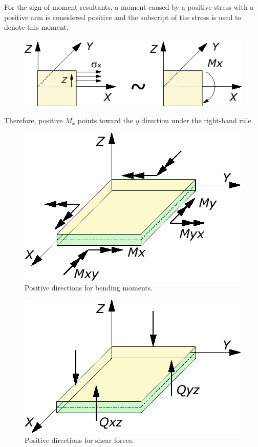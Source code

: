 For the sign of moment resultants, a moment caused by a positive stress with a positive arm is considered positive and the subscript of the stress is used to denote this moment.

\begin{figure}[h!]
\centering
\includegraphics[width=0.7\linewidth]{figures/plate_moment_positive_direction}
\caption{}
\label{fig:plate_moment_positive_direction}
\end{figure}

Therefore, positive $ M_x $ points toward the $ y $ direction under the right-hand rule.

\begin{figure}[h!]
\centering
\includegraphics[width=0.6\linewidth]{figures/plate_bending_positive_direction}
\caption{Positive directions for bending moments.}
\label{fig:plate_bending_positive_direction}
\end{figure}

\begin{figure}[h!]
\centering
\includegraphics[width=0.6\linewidth]{figures/plate_shear_force_positive_direction}
\caption{Positive directions for shear forces.}
\label{fig:plate_shear_force_positive_direction}
\end{figure}

